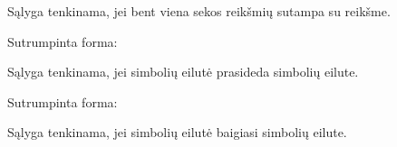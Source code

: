 \documentclass[letterpaper,10pt,lithuanian]{sphinxmanual}
\begin{document}
\begin{fulllineitems}
\begin{fulllineitems}
\sphinxAtStartPar
Sąlyga tenkinama, jei bent viena  sekos reikšmių sutampa su  reikšme.

\end{fulllineitems}


\begin{fulllineitems}
\label{\detokenize{formules:startswith}}
\pysigstartsignatures
\pysiglinewithargsret
{}
{\sphinxparamcomma {}}
{}
\pysigstopsignatures
\sphinxAtStartPar
Sutrumpinta forma:

\begin{sphinxVerbatim}[commandchars=\\\{\}]
\end{sphinxVerbatim}

\sphinxAtStartPar
Sąlyga tenkinama, jei  simbolių eilutė prasideda  simbolių eilute.

\end{fulllineitems}


\begin{fulllineitems}
\label{\detokenize{formules:endswith}}
\pysigstartsignatures
\pysiglinewithargsret
{}
{\sphinxparamcomma {}}
{}
\pysigstopsignatures
\sphinxAtStartPar
Sutrumpinta forma:

\begin{sphinxVerbatim}[commandchars=\\\{\}]
\end{sphinxVerbatim}

\sphinxAtStartPar
Sąlyga tenkinama, jei  simbolių eilutė baigiasi  simbolių eilute.


\end{fulllineitems}
\end{fulllineitems}
\end{document}
